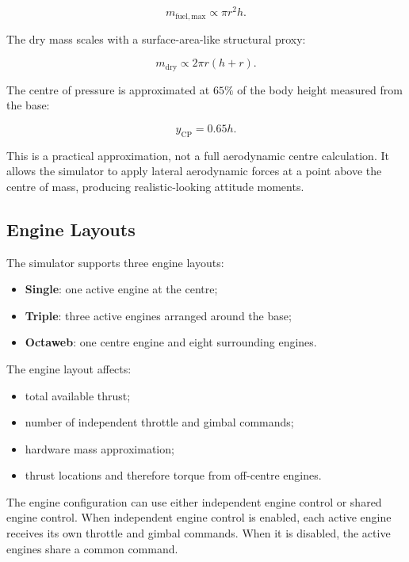 \documentclass[12pt,a4paper]{article}
\begin{document}
\begin{equation}
m_{\mathrm{fuel,max}} \propto \pi r^2 h.
\end{equation}

The dry mass scales with a surface-area-like structural proxy:

\begin{equation}
m_{\mathrm{dry}} \propto 2\pi r(h+r).
\end{equation}

The centre of pressure is approximated at \(65\%\) of the body height measured from the base:

\begin{equation}
y_{\mathrm{CP}} = 0.65h.
\end{equation}

This is a practical approximation, not a full aerodynamic centre calculation. It allows the simulator to apply lateral aerodynamic forces at a point above the centre of mass, producing realistic-looking attitude moments.

\subsection{Engine Layouts}

The simulator supports three engine layouts:

\begin{itemize}
    \item \textbf{Single}: one active engine at the centre;
    \item \textbf{Triple}: three active engines arranged around the base;
    \item \textbf{Octaweb}: one centre engine and eight surrounding engines.
\end{itemize}

The engine layout affects:

\begin{itemize}
    \item total available thrust;
    \item number of independent throttle and gimbal commands;
    \item hardware mass approximation;
    \item thrust locations and therefore torque from off-centre engines.
\end{itemize}

The engine configuration can use either independent engine control or shared engine control. When independent engine control is enabled, each active engine receives its own throttle and gimbal commands. When it is disabled, the active engines share a common command.
\end{document}
